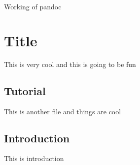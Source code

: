 \documentclass{article}
\newcommand{\coverpage}{
    \begin{titlepage}
        \LARGE{Working of pandoc}
    \end{titlepage}
}
\begin{document}
        
    \coverpage
    
    

    \hypertarget{title}{%
    \section{Title}\label{title}}
    
    This is very cool and this is going to be fun
    
    \hypertarget{tutorial}{%
    \subsection{Tutorial}\label{tutorial}}
    
    This is another file and things are cool
    
    \hypertarget{introduction}{%
    \subsection{Introduction}\label{introduction}}
    
    This is introduction
\end{document}
